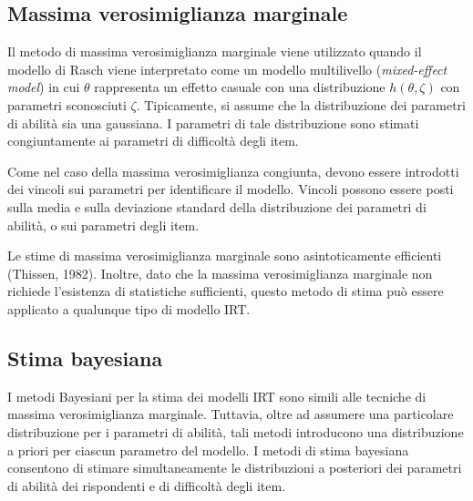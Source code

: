 \subsection{Massima verosimiglianza marginale}

Il metodo di massima verosimiglianza marginale viene utilizzato quando il modello di Rasch viene interpretato come un modello multilivello ({\it mixed-effect model}) in cui $\theta$ rappresenta un effetto casuale con una distribuzione $h(\theta, \zeta)$ con parametri sconosciuti $\zeta$. Tipicamente, si assume che la distribuzione dei parametri di abilità sia una gaussiana. I parametri di tale distribuzione sono stimati congiuntamente ai parametri di difficoltà degli item. 

Come nel caso della massima verosimiglianza congiunta, devono essere introdotti dei vincoli sui parametri per identificare il modello.  Vincoli possono essere posti sulla media e sulla deviazione standard della distribuzione dei parametri di abilità, o sui parametri degli item. 

Le stime di massima verosimiglianza marginale sono asintoticamente efficienti (Thissen, 1982).  Inoltre, dato che la massima verosimiglianza marginale non richiede l'esistenza di statistiche sufficienti, questo metodo di stima può essere applicato a qualunque tipo di modello IRT.


\subsection{Stima bayesiana}

I metodi Bayesiani per la stima dei modelli IRT sono simili alle tecniche di massima verosimiglianza marginale.  Tuttavia, oltre ad assumere una particolare distribuzione per i parametri di abilità, tali metodi introducono  una distribuzione a priori per ciascun parametro del modello. I metodi di stima bayesiana consentono di stimare simultaneamente le distribuzioni a posteriori dei parametri di abilità dei rispondenti e di difficoltà degli item. 
